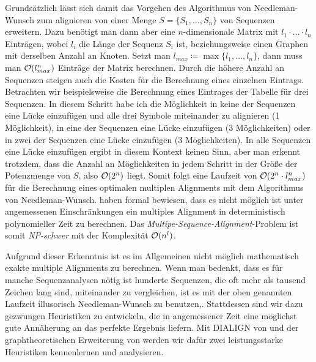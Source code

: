Grundsätzlich lässt sich damit das Vorgehen des Algorithmus von Needleman-Wunsch zum alignieren von einer Menge $S = \{S_1,\dots,S_n\}$ von Sequenzen erweitern. Dazu benötigt man dann aber eine $n$-dimensionale Matrix mit $l_1\cdot \dots \cdot l_n$ Einträgen, wobei $l_i$ die Länge der Sequenz $S_i$ ist, beziehungsweise einen Graphen mit derselben Anzahl an Knoten. Setzt man $l_{max} \coloneqq \max\{l_1,\dots,l_n\}$, dann muss man $\mathcal{O}(l_{max}^n)$ Einträge der Matrix berechnen. Durch die höhere Anzahl an Sequenzen steigen auch die Kosten für die Berechnung eines einzelnen Eintrags. Betrachten wir beispielsweise die Berechnung eines Eintrages der Tabelle für drei Sequenzen. In diesem Schritt habe ich die Möglichkeit in keine der Sequenzen eine Lücke einzufügen und alle drei Symbole miteinander zu alignieren (1 Möglichkeit), in eine der Sequenzen eine Lücke einzufügen (3 Möglichkeiten) oder in zwei der Sequenzen eine Lücke einzufügen (3 Möglichkeiten). In alle Sequenzen eine Lücke einzufügen ergibt in diesem Kontext keinen Sinn, aber man erkennt trotzdem, dass die Anzahl an Möglichkeiten in jedem Schritt in der Größe der Potenzmenge von $S$, also $\mathcal{O}(2^n)$ liegt. Somit folgt eine Laufzeit von $\mathcal{O}(2^n\cdot l_{max}^n)$ für die Berechnung eines optimalen multiplen Alignments mit dem Algorithmus von Needleman-Wunsch. \cite{wj94} haben formal bewiesen, dass es nicht möglich ist unter angemessenen Einschränkungen ein multiples Alignment in deterministisch polynomieller Zeit zu berechnen. Das \emph{Multipe-Sequence-Alignment}-Problem ist somit \emph{NP-schwer} mit der Komplexität $\mathcal{O}(n^l)$.

Aufgrund dieser Erkenntnis ist es im Allgemeinen nicht möglich mathematisch exakte multiple Alignments zu berechnen. Wenn man bedenkt, dass es für manche Sequenzanalysen nötig ist hunderte Sequenzen, die oft mehr als tausend Zeichen lang sind, miteinander zu vergleichen, ist es mit der oben genannten Laufzeit illusorisch Needleman-Wunsch zu benutzen,. Stattdessen sind wir dazu gezwungen Heuristiken zu entwickeln, die in angemessener Zeit eine möglichst gute Annäherung an das perfekte Ergebnis liefern. Mit DIALIGN von \cite{mdw96} und der graphtheoretischen Erweiterung von \cite{cpm10} werden wir dafür zwei leistungsstarke Heuristiken kennenlernen und analysieren.